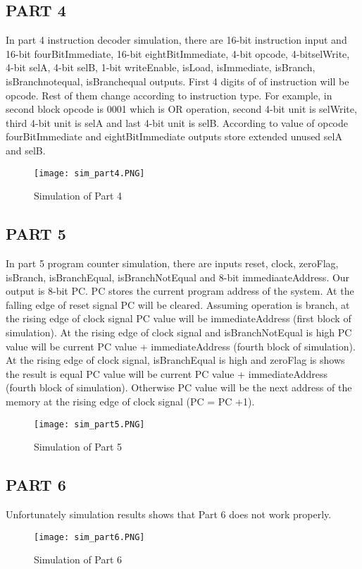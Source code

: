 \documentclass[pdftex,12pt,a4paper]{article}
\begin{document}
\clearpage

\subsection{PART 4}
In part 4 instruction decoder simulation, there are 16-bit instruction input and 16-bit fourBitImmediate, 16-bit eightBitImmediate, 4-bit opcode, 4-bitselWrite, 4-bit selA, 4-bit selB, 1-bit writeEnable, isLoad, isImmediate, isBranch, isBranchnotequal, isBranchequal outputs. First 4 digits of of instruction will be opcode. Rest of them change according to instruction type. For example, in second block opcode is 0001 which is OR operation, second 4-bit unit is selWrite, third 4-bit unit is selA and last 4-bit unit is selB. According to value of opcode fourBitImmediate and eightBitImmediate outputs store extended unused selA and selB.
\begin{figure}[ht]
	\centering
	\texttt{[image: sim\_part4.PNG]}	
	\caption{Simulation of Part 4}
	\label{fig1}
\end{figure}

\clearpage

\subsection{PART 5}
In part 5 program counter simulation, there are inputs reset, clock, zeroFlag, isBranch, isBranchEqual, isBranchNotEqual and 8-bit immediaateAddress. Our output is 8-bit PC. PC stores the current program address of the system. At the falling edge of reset signal PC will be cleared. Assuming operation is branch, at the rising edge of clock signal PC value will be immediateAddress (first block of simulation). At the rising edge of clock signal and isBranchNotEqual is high PC value will be current PC value + immediateAddress (fourth block of simulation). At the rising edge of clock signal, isBranchEqual is high and zeroFlag is shows the result is equal PC value will be current PC value + immediateAddress (fourth block of simulation). Otherwise PC value will be the next address of the memory at the rising edge of clock signal (PC = PC +1).
\begin{figure}[ht]
	\centering
	\texttt{[image: sim\_part5.PNG]}	
	\caption{Simulation of Part 5}
	\label{fig1}
\end{figure}


\subsection{PART 6}
Unfortunately simulation results shows that Part 6 does not work properly. 
\begin{figure}[ht]
	\centering
	\texttt{[image: sim\_part6.PNG]}	
	\caption{Simulation of Part 6}
	\label{fig1}
\end{figure}
\clearpage
\end{document}
